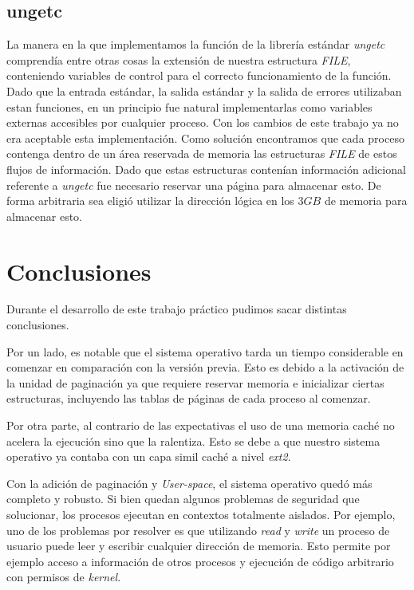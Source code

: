 \documentclass[a4paper,10pt]{article}
\begin{document}
	    \subsection{ungetc}

	    La manera en la que implementamos la función de la librería estándar \textit{ungetc} comprendía entre otras cosas la
	    extensión de nuestra estructura \textit{FILE}, conteniendo variables de control para el correcto funcionamiento de la función.
	    Dado que la entrada estándar, la salida estándar y la salida de errores utilizaban estan funciones, en un principio fue		
	    natural implementarlas como variables externas accesibles por cualquier proceso. Con los cambios de este trabajo ya no era
	    aceptable esta implementación.
	    Como solución encontramos que cada proceso contenga dentro de un área reservada de memoria las estructuras \textit{FILE} de 
	    estos flujos de información. Dado que estas estructuras contenían información adicional referente a \textit{ungetc} fue 
	    necesario reservar una página para almacenar esto. De forma arbitraria sea eligió utilizar la dirección lógica en los $3GB$ 
	    de memoria para almacenar esto.

\newpage

\section{Conclusiones}

Durante el desarrollo de este trabajo práctico pudimos sacar distintas conclusiones.

Por un lado, es notable que el sistema operativo tarda un tiempo considerable en comenzar en comparación con la versión previa.
Esto es debido a la activación de la unidad de paginación ya que requiere reservar memoria e inicializar ciertas estructuras, 
incluyendo las tablas de páginas de cada proceso al comenzar. 

Por otra parte, al contrario de las expectativas el uso de una memoria caché no acelera la ejecución sino que la ralentiza. Esto se
debe a que nuestro sistema operativo ya contaba con un capa simil caché a nivel \textit{ext2}. 

Con la adición de paginación y \textit{User-space}, el sistema operativo quedó más completo y robusto.
Si bien quedan algunos problemas de seguridad que solucionar, los procesos ejecutan en contextos totalmente aislados.
Por ejemplo, uno de los problemas por resolver es que utilizando \textit{read} y \textit{write} un proceso de usuario puede leer y escribir cualquier dirección de memoria.
Esto permite por ejemplo acceso a información de otros procesos y ejecución de código arbitrario con permisos de \textit{kernel}.
\end{document}
